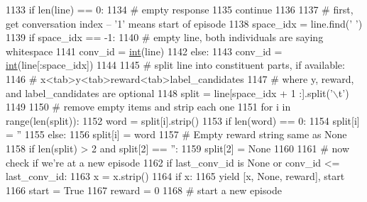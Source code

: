 \begin{DoxyCode}
1133                 \textcolor{keywordflow}{if} len(line) == 0:
1134                     \textcolor{comment}{# empty response}
1135                     \textcolor{keywordflow}{continue}
1136 
1137                 \textcolor{comment}{# first, get conversation index -- '1' means start of episode}
1138                 space\_idx = line.find(\textcolor{stringliteral}{' '})
1139                 \textcolor{keywordflow}{if} space\_idx == -1:
1140                     \textcolor{comment}{# empty line, both individuals are saying whitespace}
1141                     conv\_id = \hyperlink{namespacelanguage__model_1_1eval__ppl_a7d12ee00479673c5c8d1f6d01faa272a}{int}(line)
1142                 \textcolor{keywordflow}{else}:
1143                     conv\_id = \hyperlink{namespacelanguage__model_1_1eval__ppl_a7d12ee00479673c5c8d1f6d01faa272a}{int}(line[:space\_idx])
1144 
1145                 \textcolor{comment}{# split line into constituent parts, if available:}
1146                 \textcolor{comment}{# x<tab>y<tab>reward<tab>label\_candidates}
1147                 \textcolor{comment}{# where y, reward, and label\_candidates are optional}
1148                 split = line[space\_idx + 1 :].split(\textcolor{stringliteral}{'\(\backslash\)t'})
1149 
1150                 \textcolor{comment}{# remove empty items and strip each one}
1151                 \textcolor{keywordflow}{for} i \textcolor{keywordflow}{in} range(len(split)):
1152                     word = split[i].strip()
1153                     \textcolor{keywordflow}{if} len(word) == 0:
1154                         split[i] = \textcolor{stringliteral}{''}
1155                     \textcolor{keywordflow}{else}:
1156                         split[i] = word
1157                 \textcolor{comment}{# Empty reward string same as None}
1158                 \textcolor{keywordflow}{if} len(split) > 2 \textcolor{keywordflow}{and} split[2] == \textcolor{stringliteral}{''}:
1159                     split[2] = \textcolor{keywordtype}{None}
1160 
1161                 \textcolor{comment}{# now check if we're at a new episode}
1162                 \textcolor{keywordflow}{if} last\_conv\_id \textcolor{keywordflow}{is} \textcolor{keywordtype}{None} \textcolor{keywordflow}{or} conv\_id <= last\_conv\_id:
1163                     x = x.strip()
1164                     \textcolor{keywordflow}{if} x:
1165                         \textcolor{keywordflow}{yield} [x, \textcolor{keywordtype}{None}, reward], start
1166                     start = \textcolor{keyword}{True}
1167                     reward = 0
1168                     \textcolor{comment}{# start a new episode}

\end{DoxyCode}
